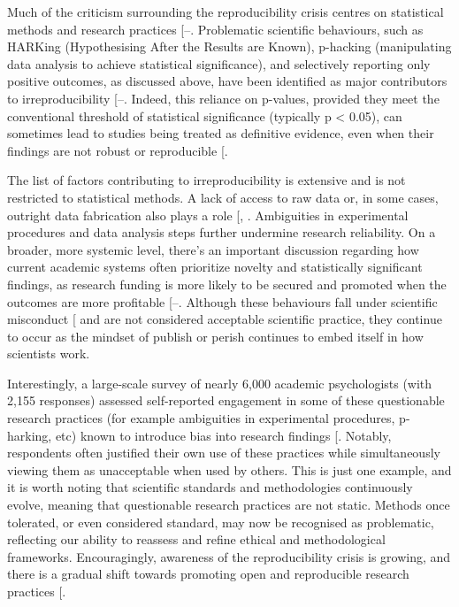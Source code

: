 \documentclass[
  11pt,
  letterpaper,
]{scrreprt}
\begin{document}
Much of the criticism surrounding the reproducibility crisis centres on
statistical methods and research practices
{[}--\citeproc{ref-stefan2023Big}{341}{]}.
Problematic scientific behaviours, such as HARKing (Hypothesising After
the Results are Known), p-hacking (manipulating data analysis to achieve
statistical significance), and selectively reporting only positive
outcomes, as discussed above, have been identified as major contributors
to irreproducibility
{[}--\citeproc{ref-lew2020Reckless}{344}{]}.
Indeed, this reliance on p-values, provided they meet the conventional
threshold of statistical significance (typically p \textless{} 0.05),
can sometimes lead to studies being treated as definitive evidence, even
when their findings are not robust or reproducible
{[}\citeproc{ref-lew2020Reckless}{344}{]}.

The list of factors contributing to irreproducibility is extensive and
is not restricted to statistical methods. A lack of access to raw data
or, in some cases, outright data fabrication also plays a role
{[},
\citeproc{ref-bausell2021Problem}{346}{]}. Ambiguities in experimental
procedures and data analysis steps further undermine research
reliability. On a broader, more systemic level, there's an important
discussion regarding how current academic systems often prioritize
novelty and statistically significant findings, as research funding is
more likely to be secured and promoted when the outcomes are more
profitable
{[}--\citeproc{ref-ebadi2016How}{349}{]}.
Although these behaviours fall under scientific misconduct
{[}\citeproc{ref-science2023Reproducibility}{350}{]} and are not
considered acceptable scientific practice, they continue to occur as the
mindset of publish or perish continues to embed itself in how scientists
work.

Interestingly, a large-scale survey of nearly 6,000 academic
psychologists (with 2,155 responses) assessed self-reported engagement
in some of these questionable research practices (for example
ambiguities in experimental procedures, p-harking, etc) known to
introduce bias into research findings
{[}\citeproc{ref-john2012Measuring}{351}{]}. Notably, respondents often
justified their own use of these practices while simultaneously viewing
them as unacceptable when used by others. This is just one example, and
it is worth noting that scientific standards and methodologies
continuously evolve, meaning that questionable research practices are
not static. Methods once tolerated, or even considered standard, may now
be recognised as problematic, reflecting our ability to reassess and
refine ethical and methodological frameworks. Encouragingly, awareness
of the reproducibility crisis is growing, and there is a gradual shift
towards promoting open and reproducible research practices
{[}\citeproc{ref-nature2018Challenges}{353}{]}.
\end{document}
